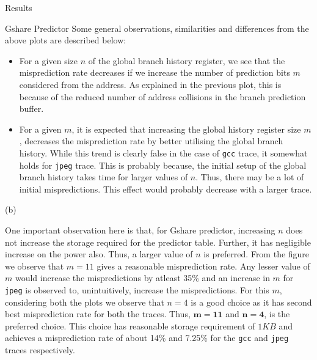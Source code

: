 \begin{section}{Results}
\begin{subsection}{Gshare Predictor}
        Some general observations, similarities and differences from the above plots are described below:
        \begin{itemize}
            \item For a given size $n$ of the global branch history register, we see that the misprediction rate decreases if we increase the number of prediction bits $m$ considered from the address. As explained in the previous plot, this is because of the reduced number of address collisions in the branch prediction buffer.
            \item For a given $m$, it is expected that increasing the global history register size $m$, decreases the misprediction rate by better utilising the global branch history. While this trend is clearly false in the case of \texttt{gcc} trace, it somewhat holds for \texttt{jpeg} trace. This is probably because, the initial setup of the global branch history takes time for larger values of $n$. Thus, there may be a lot of initial mispredictions. This effect would probably decrease with a larger trace.
        \end{itemize}

        \begin{center}
            (b)
        \end{center}
        One important observation here is that, for Gshare predictor, increasing $n$ does not increase the storage required for the predictor table. Further, it has negligible increase on the power also. Thus, a larger value of $n$ is preferred. From the figure we observe that $m=11$ gives a reasonable misprediction rate. Any lesser value of $m$ would increase the mispredictions by atleast 35\% and an increase in $m$ for \texttt{jpeg} is observed to, unintuitively, increase the mispredictions. For this $m$, considering both the plots we observe that $n=4$ is a good choice as it has second best misprediction rate for both the traces. Thus, $\mathbf{m=11}$ and $\mathbf{n=4}$, is the preferred choice. This choice has reasonable storage requirement of $1KB$ and achieves a misprediction rate of about 14\% and 7.25\% for the \texttt{gcc} and \texttt{jpeg} traces respectively.

    \end{subsection}

\end{section}